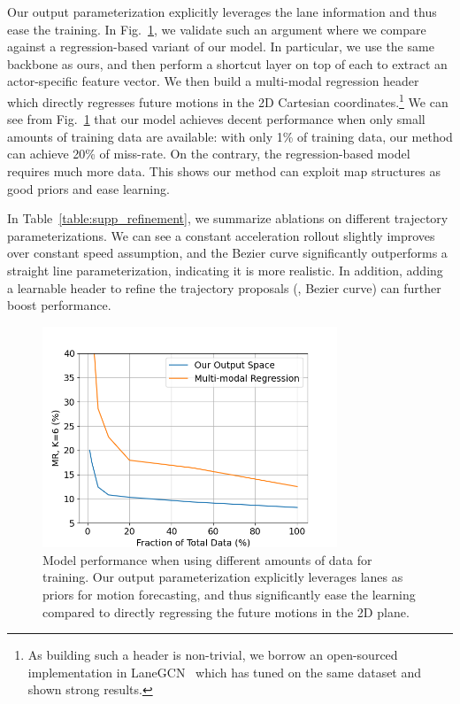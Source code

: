Our output parameterization
explicitly leverages the lane information and thus ease the training. In
Fig.~\ref{fig:supp_output}, we validate such an argument where we compare against a
regression-based variant of our model. In particular, we use the same backbone
as ours, and then perform a shortcut layer on top of each \ROI to extract an
actor-specific feature vector. We then build a multi-modal regression header
which directly regresses future motions in the 2D Cartesian
coordinates.\footnote{As building such a header is non-trivial, we borrow an
open-sourced implementation in LaneGCN~\cite{lgn} which has tuned on the same
dataset and shown strong results.} We can see from Fig.~\ref{fig:supp_output} that our
model achieves decent performance when only small amounts of training
data are available: with only 1\% of training data, our method can achieve 20\%
of miss-rate. On the contrary, the regression-based model requires much more
data. This shows our method can exploit map structures as good priors and ease
learning.

In Table~\ref{table:supp_refinement}, we summarize ablations on different trajectory
parameterizations. We can see a constant acceleration rollout slightly improves
over constant speed assumption, and the Bezier curve significantly outperforms a
straight line parameterization, indicating it is more realistic. In addition,
adding a learnable header to refine the trajectory proposals (\eg, Bezier curve)
can further boost performance. 

\begin{figure}[t]
\begin{center}
  \includegraphics[height=6.6cm]{figures/supp/data_curve.png}
\end{center}
\caption{Model performance when using different amounts of data for training.
  Our output parameterization explicitly leverages lanes as priors for motion
  forecasting, and thus significantly ease the learning compared to directly
  regressing the future motions in the 2D plane.
}
\label{fig:supp_output}
\end{figure}

